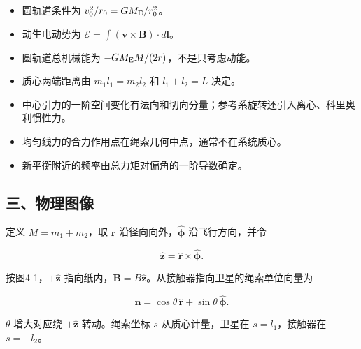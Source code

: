 \documentclass[12pt,a4paper,fontset=fandol]{ctexart}
\providecommand{\tightlist}{\setlength{\itemsep}{0pt}\setlength{\parskip}{0pt}}
\begin{document}
\begin{itemize}
\tightlist
\item
  圆轨道条件为 \(v_0^2/r_0=GM_{\rm E}/r_0^2\)。
\item
  动生电动势为
  \(\mathcal E=\int(\boldsymbol v\times\boldsymbol B)\cdot d\boldsymbol l\)。
\item
  圆轨道总机械能为 \(-GM_{\rm E}M/(2r)\)，不是只考虑动能。
\item
  质心两端距离由 \(m_1l_1=m_2l_2\) 和 \(l_1+l_2=L\) 决定。
\item
  中心引力的一阶空间变化有法向和切向分量；参考系旋转还引入离心、科里奥利惯性力。
\item
  均匀线力的合力作用点在绳索几何中点，通常不在系统质心。
\item
  新平衡附近的频率由总力矩对偏角的一阶导数确定。
\end{itemize}

\subsection{三、物理图像}\label{ux4e09ux7269ux7406ux56feux50cf-3}

定义 \(M=m_1+m_2\)，取 \(\hat{\boldsymbol r}\)
沿径向向外，\(\hat{\boldsymbol\phi}\) 沿飞行方向，并令

\[
\hat{\boldsymbol z}=\hat{\boldsymbol r}\times\hat{\boldsymbol\phi}.
\]

按图4-1，\(+\hat{\boldsymbol z}\)
指向纸内，\(\boldsymbol B=B\hat{\boldsymbol z}\)。从接触器指向卫星的绳索单位向量为

\[
\boldsymbol n=\cos\theta\,\hat{\boldsymbol r}+\sin\theta\,\hat{\boldsymbol\phi}.
\]

\(\theta\) 增大对应绕 \(+\hat{\boldsymbol z}\) 转动。绳索坐标 \(s\)
从质心计量，卫星在 \(s=l_1\)，接触器在 \(s=-l_2\)。
\end{document}
